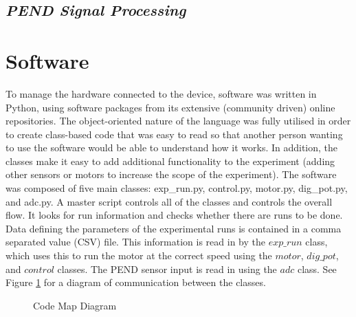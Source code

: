 \documentclass[a4]{report}
\begin{document}
	\subsection{\textit{PEND Signal Processing}}



	\section{Software}
	To manage the hardware connected to the device, software was written in Python, using software packages from its extensive (community driven) online repositories. The object-oriented nature of the language was fully utilised in order to create class-based code that was easy to read so that another person wanting to use the software would be able to understand how it works. In addition, the classes make it easy to add additional functionality to the experiment (adding other sensors or motors to increase the scope of the experiment). The software was composed of five main classes: exp\_run.py, control.py, motor.py, dig\_pot.py, and adc.py. \newline \newline \noindent
	A master script controls all of the classes and controls the overall flow. It looks for run information and checks whether there are runs to be done. Data defining the parameters of the experimental runs is contained in a comma separated value (CSV) file. This information is read in by the \(exp\_run\) class, which uses this to run the motor at the correct speed using the \(motor\), \(dig\_pot\), and \(control\) classes. The PEND sensor input is read in using the \(adc\) class. See Figure \ref{codemap} for a diagram of communication between the classes. \newline 
	\begin{figure}[!htb]
		\centering
		\caption{Code Map Diagram}
		\label{codemap}
	\end{figure}
	
\end{document}
